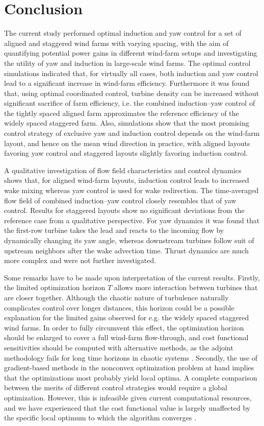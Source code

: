 \documentclass[a4paper]{jpconf}
\begin{document}
\section{Conclusion}\label{sec:conc}
The current study performed optimal induction and yaw control for a set of aligned and staggered wind farms with varying spacing, with the aim of quantifying potential power gains in different wind-farm setups and investigating the utility of yaw and induction in large-scale wind farms. The optimal control simulations indicated that, for virtually all cases, both induction and yaw control lead to a significant increase in wind-farm efficiency. Furthermore it was found that, using optimal coordinated control, turbine density can be increased without significant sacrifice of farm efficiency, i.e. the combined induction--yaw control of the tightly spaced aligned farm approximates the reference efficiency of the widely spaced staggered farm. Also, simulations show that the most promising control strategy of exclusive yaw and induction control depends on the wind-farm layout, and hence on the mean wind direction in practice, with aligned layouts favoring yaw control and staggered layouts slightly favoring induction control. 





A qualitative investigation of flow field characteristics and control dynamics shows that, for aligned wind-farm layouts, induction control leads to increased wake mixing whereas yaw control is used for wake redirection. The time-averaged flow field of combined induction--yaw control closely resembles that of yaw control. Results for staggered layouts show no significant deviations from the reference case from a qualitative perspective. For yaw dynamics it was found that the first-row turbine takes the lead and reacts to the incoming flow by dynamically changing its yaw angle, whereas downstream turbines follow suit of upstream neighbors after the wake advection time. Thrust dynamics are much more complex and were not further investigated. 

Some remarks have to be made upon interpretation of the current results. Firstly, the limited optimization horizon $T$ allows more interaction between turbines that are closer together. Although the chaotic nature of turbulence naturally complicates control over longer distances, this horizon could be a possible explanation for the limited gains observed for e.g. the widely spaced staggered wind farms. In order to fully circumvent this effect, the optimization horizon should be enlarged to cover a full wind-farm flow-through, and cost functional sensitivities should be computed with alternative methods, as the adjoint methodology fails for long time horizons in chaotic systems \cite{wang}. Secondly, the use of gradient-based methods in the nonconvex optimization problem at hand implies that the optimizations most probably yield local optima. A complete comparison between the merits of different control strategies would require a global optimization. However, this is infeasible given current computational resources, and we have experienced that the cost functional value is largely unaffected by the specific local optimum to which the algorithm converges \cite{munters}. 
\end{document}
